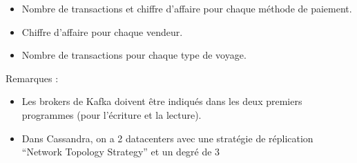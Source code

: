 \documentclass[a4paper, 11pt, titlepage]{article}
\begin{document}
\begin{itemize}
\item
Nombre de transactions et chiffre d'affaire pour chaque méthode de paiement.
\item
Chiffre d'affaire pour chaque vendeur.
\item
Nombre de transactions pour chaque type de voyage.\\
\end{itemize}


Remarques :

\begin{itemize}

\item
Les brokers de Kafka doivent être indiqués dans les deux premiers programmes (pour l'écriture et la lecture).

\item
Dans Cassandra, on a 2 datacenters avec une stratégie de réplication “Network Topology Strategy” et  un degré de 3
 
\end{itemize}
\end{document}
